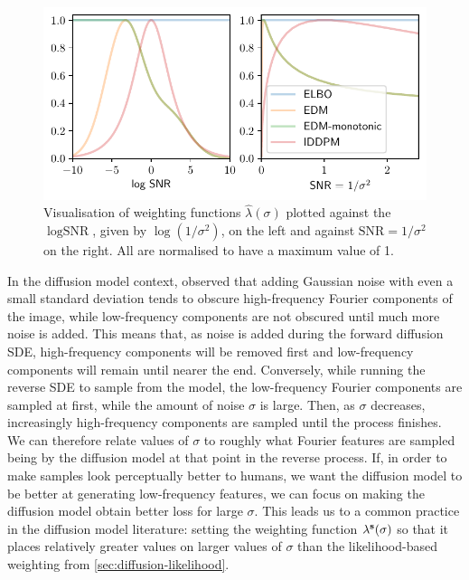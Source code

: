 \begin{figure}
    \centering
    \includegraphics[width=\textwidth]{figs/thesis/diffusion_weighting.pdf}
    \caption{Visualisation of weighting functions $\hat{\lambda}(\sigma)$ plotted against the $\log \text{SNR}$, given by $\log(1/\sigma^2)$, on the left and against $\text{SNR} = 1/\sigma^2$ on the right. All are normalised to have a maximum value of 1.}
    \label{fig:diffusion-weighting}
\end{figure}

In the diffusion model context, \citet{yang2023diffusion} observed that adding Gaussian noise with even a small standard deviation tends to obscure high-frequency Fourier components of the image, while low-frequency components are not obscured until much more noise is added. This means that, as noise is added during the forward diffusion SDE, high-frequency components will be removed first and low-frequency components will remain until nearer the end. Conversely, while running the reverse SDE to sample from the model, the low-frequency Fourier components are sampled at first, while the amount of noise $\sigma$ is large. Then, as $\sigma$ decreases, increasingly high-frequency components are sampled until the process finishes. We can therefore relate values of $\sigma$ to roughly what Fourier features are sampled being by the diffusion model at that point in the reverse process. If, in order to make samples look perceptually better to humans, we want the diffusion model to be better at generating low-frequency features, we can focus on making the diffusion model obtain better loss for large $\sigma$. This leads us to a common practice in the diffusion model literature: setting the weighting function $\lambda^{\mathbf{s}}(\sigma)$ so that it places relatively greater values on larger values of $\sigma$ than the likelihood-based weighting from \cref{sec:diffusion-likelihood}.

